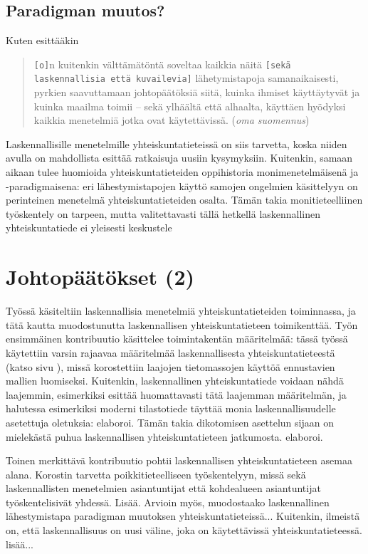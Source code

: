 \documentclass[finnish,gradu,twoside,12pt]{tktltiki}
\begin{document}
{\subsection{Paradigman muutos?}

Kuten \citet[265]{watts11} esittääkin

\begin{quote}
\texttt{[o]}n kuitenkin välttämätöntä soveltaa kaikkia näitä \texttt{[sekä laskennallisia että kuvailevia]} lähetymistapoja samanaikaisesti, pyrkien saavuttamaan johtopäätöksiä siitä, kuinka ihmiset käyttäytyvät ja kuinka maailma toimii -- sekä ylhäältä että alhaalta, käyttäen hyödyksi kaikkia menetelmiä jotka ovat käytettävissä. (\textit{oma suomennus})
\end{quote}

Laskennallisille menetelmille yhteiskuntatieteissä on siis tarvetta, koska niiden avulla on mahdollista esittää ratkaisuja uusiin kysymyksiin. Kuitenkin, samaan aikaan tulee huomioida yhteiskuntatieteiden oppihistoria monimenetelmäisenä ja -paradigmaisena: eri lähestymistapojen käyttö samojen ongelmien käsittelyyn on perinteinen menetelmä yhteiskuntatieteiden osalta. Tämän takia monitieteelliinen työskentely on tarpeen, mutta valitettavasti tällä hetkellä laskennallinen yhteiskuntatiede ei yleisesti keskustele 

\section{Johtopäätökset (2)}

Työssä käsiteltiin laskennallisia menetelmiä yhteiskuntatieteiden toiminnassa, ja tätä kautta muodostunutta laskennallisen yhteiskuntatieteen toimikenttää. Työn ensimmäinen kontribuutio käsittelee toimintakentän määritelmää: tässä työssä käytettiin varsin rajaavaa määritelmää laskennallisesta yhteiskuntatieteestä (katso sivu \pageref{css-maar}), missä korostettiin laajojen tietomassojen käyttöä ennustavien mallien luomiseksi. Kuitenkin, laskennallinen yhteiskuntatiede voidaan nähdä laajemmin, esimerkiksi \citet{cioffi-revilla10} esittää huomattavasti tätä laajemman määritelmän, ja halutessa esimerkiksi moderni tilastotiede täyttää monia laskennallisuudelle asetettuja oletuksia: elaboroi. Tämän takia dikotomisen asettelun sijaan on mielekästä puhua laskennallisen yhteiskuntatieteen jatkumosta. elaboroi.

Toinen merkittävä kontribuutio pohtii laskennallisen yhteiskuntatieteen asemaa alana. Korostin tarvetta poikkitieteelliseen työskentelyyn, missä sekä laskennallisten menetelmien asiantuntijat että kohdealueen asiantuntijat työskentelisivät yhdessä. Lisää. Arvioin myös, muodostaako laskennallinen lähestymistapa paradigman muutoksen yhteiskuntatieteissä... Kuitenkin, ilmeistä on, että laskennallisuus on uusi väline, joka on käytettävissä yhteiskuntatieteessä. lisää...

}
\end{document}
